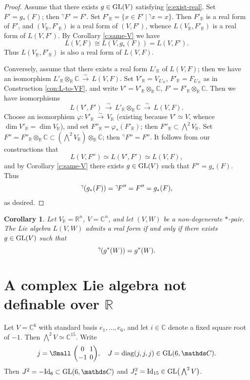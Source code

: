 \documentclass[11pt]{amsart}
\theoremstyle{plain}
\newtheorem{corollary}[theorem]{Corollary}
\theoremstyle{definition}
\newcommand{\SmallMatrix}[1]{\text{{%
\Small
\arraycolsep=0.4\arraycolsep\ensuremath
    {\begin{pmatrix}#1\end{pmatrix}}}}}
\newcommand{\hs}{\kern 0.8pt}
\newcommand{\C}{{\mathds C}}
\newcommand{\R}{{\mathds R}}
\newcommand{\GL}{{\rm GL}}
\newcommand{\Id}{{\rm Id}}
\newcommand{\upgam}{{{}^\gamma\!}}
\newcommand{\isoto}{{\,\overset\sim\longrightarrow\,}}
\renewcommand{\Lambda}{\textstyle\bigwedge}
\begin{document}
\begin{proof}
Assume that there exists $g\in\GL(V)$ satisfying \eqref{e:exist-real}.
Set $F'=g_*(F)$; then $\upgam F'=F'$.
Set $F'_\R=\{x\in F'\ |\ \upgam x=x\}$.
Then $F'_\R$ is a real form of $F'$, and $(V_\R,F'_\R)$ is a real form of $(V,F')$,
whence $L(V_\R, F'_\R)$ is a real form of $L(V,F')$.
By Corollary \ref{c:same-V} we have
\[ L(V,F)\cong L(V, g_*(F))=L(V,F').\]
Thus $L(V_\R, F'_\R)$ is also a real form of $L(V,F)$.

Conversely, assume that there exists a real form $L'_\R$ of $L(V,F)$;
then we have an isomorphism $L'_\R\otimes_\R\C\isoto L(V,F)$.
Set  $V'_\R=V_{L'_\R}$, $F'_\R=F_{L'_\R}$ as in Construction \ref{con:L-to-VF},
and write $V'=V'_\R\otimes _\R\C$, $F'=F'_\R\otimes _\R\C$.
Then we have isomorphisms
\[ L(V', F')\isoto L'_\R\otimes_\R\C\isoto L(V,F).\]
Choose an isomorphism $\varphi\colon V'_\R\isoto V_\R$
(existing because $V'\simeq V$, whence $\dim V'_\R=\dim V_\R$),
and set $F''_\R=\varphi_*(F'_\R)$;
then $F''_\R\subset \Lambda^2 V_\R$.
Set $F''=F''_\R\otimes_\R\C\subset (\Lambda^2 V_\R)\otimes_\R\C$; then $\upgam F''=F''$.
It follows from our constructions that
\[ L(V,F'')\simeq L(V',F')\simeq L(V,F),\]
and by Corollary \ref{c:same-V} there exists $g\in\GL(V)$ such that
$F''=g_*(F)$.
Thus
\[\upgam\hs(g_*(F))=\upgam F''=F''=g_*(F),\]
as desired.
\end{proof}

\begin{corollary}\label{c:real-form}
Let $V_\R=\R^n$, $V=\C^n$, and let $(V,W)$ be a non-degenerate $*$-pair.
The Lie algebra $L(V,W)$ admits a real form
if and only if there exists $g\in\GL(V)$
such that
\begin{equation}\label{e:exist-real-W}
\upgam\hs(g^*(W))= g^*(W).
\end{equation}
\end{corollary}







\section{A complex Lie algebra not definable over $\R$}
\label{s:F}

Let $V=\C^6$ with standard basis $e_1,\dots,e_6$, and let $i\in\C$ denote a fixed
square root of $-1$.
Then $\Lambda^2 V\simeq \C^{15}$.
Write
\[j=\SmallMatrix{0&1\\-1&0},\quad J={\rm diag}(j,j,j)\in\GL(6,\C).\]
Then $J^2=-\Id_6\subset\GL(6,\C)$ and $J_*^2=\Id_{15}\in\GL\big(\Lambda^2 V\big)$.
\end{document}
